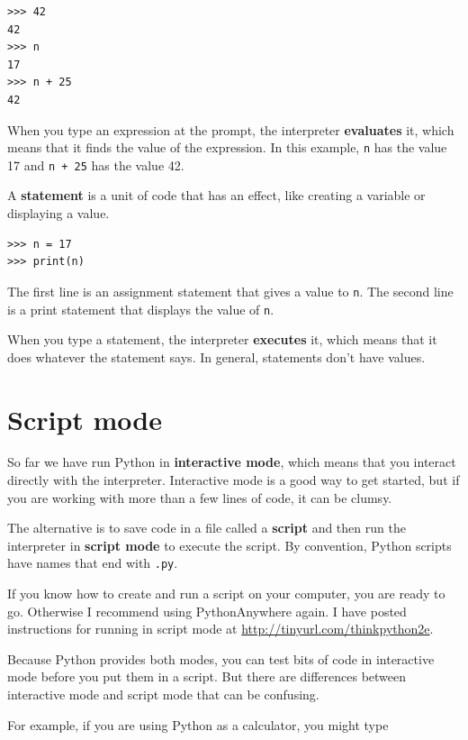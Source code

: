 \documentclass[10pt]{book}
\begin{document}
\begin{verbatim}
>>> 42
42
>>> n
17
>>> n + 25
42
\end{verbatim}
%
When you type an expression at the prompt, the interpreter
{\bf evaluates} it, which means that it finds the value of
the expression.
In this example, {\tt n} has the value 17 and
{\tt n + 25} has the value 42.

A {\bf statement} is a unit of code that has an effect, like
creating a variable or displaying a value.  

\begin{verbatim}
>>> n = 17
>>> print(n)
\end{verbatim}
%
The first line is an assignment statement that gives a value to
{\tt n}.  The second line is a print statement that displays the
value of {\tt n}.

When you type a statement, the interpreter {\bf executes} it,
which means that it does whatever the statement says.  In general,
statements don't have values.


\section{Script mode}

So far we have run Python in {\bf interactive mode}, which
means that you interact directly with the interpreter.
Interactive mode is a good way to get started,
but if you are working with more than a few lines of code, it can be
clumsy.

The alternative is to save code in a file called a {\bf script} and
then run the interpreter in {\bf script mode} to execute the script.  By
convention, Python scripts have names that end with {\tt .py}.

If you know how to create and run a script on your computer, you
are ready to go.  Otherwise I recommend using PythonAnywhere again.
I have posted instructions for running in script mode at
\url{http://tinyurl.com/thinkpython2e}.

Because Python provides both modes,
you can test bits of code in interactive mode before you put them
in a script.  But there are differences between interactive mode
and script mode that can be confusing.

For example, if you are using Python as a calculator, you might type
\end{document}
